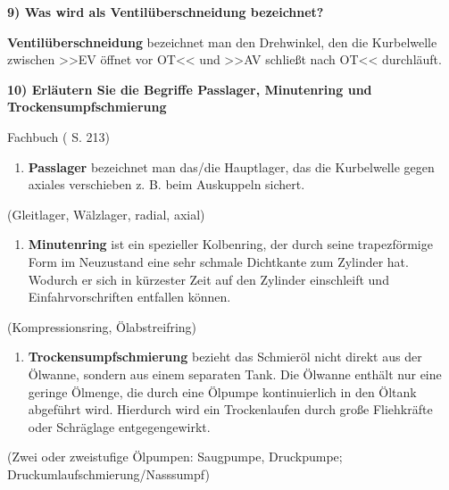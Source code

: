 \textbf{9) Was wird als Ventilüberschneidung bezeichnet?}

\textbf{Ventilüberschneidung} bezeichnet man den Drehwinkel, den die
Kurbelwelle zwischen >>EV öffnet vor OT<< und >>AV schließt nach OT<<
durchläuft.

\textbf{10) Erläutern Sie die Begriffe Passlager, Minutenring und
Trockensumpfschmierung}

Fachbuch (\textcite{brand:2020:fachkundeKfz} S. 213)

\begin{enumerate}
\def\labelenumi{(\arabic{enumi})}
\item
  \textbf{Passlager} bezeichnet man das/die Hauptlager, das die
  Kurbelwelle gegen axiales verschieben z. B. beim Auskuppeln sichert.
\end{enumerate}

(Gleitlager, Wälzlager, radial, axial)

\begin{enumerate}
\def\labelenumi{(\arabic{enumi})}
\setcounter{enumi}{1}
\item
  \textbf{Minutenring} ist ein spezieller Kolbenring, der durch seine
  trapezförmige Form im Neuzustand eine sehr schmale Dichtkante zum
  Zylinder hat. Wodurch er sich in kürzester Zeit auf den Zylinder
  einschleift und Einfahrvorschriften entfallen können.
\end{enumerate}

(Kompressionsring, Ölabstreifring)

\begin{enumerate}
\def\labelenumi{(\arabic{enumi})}
\setcounter{enumi}{2}
\item
  \textbf{Trockensumpfschmierung} bezieht das Schmieröl nicht direkt aus
  der Ölwanne, sondern aus einem separaten Tank. Die Ölwanne enthält nur
  eine geringe Ölmenge, die durch eine Ölpumpe kontinuierlich in den
  Öltank abgeführt wird. Hierdurch wird ein Trockenlaufen durch große
  Fliehkräfte oder Schräglage entgegengewirkt.
\end{enumerate}

(Zwei oder zweistufige Ölpumpen: Saugpumpe, Druckpumpe;
Druckumlaufschmierung/Nasssumpf)
